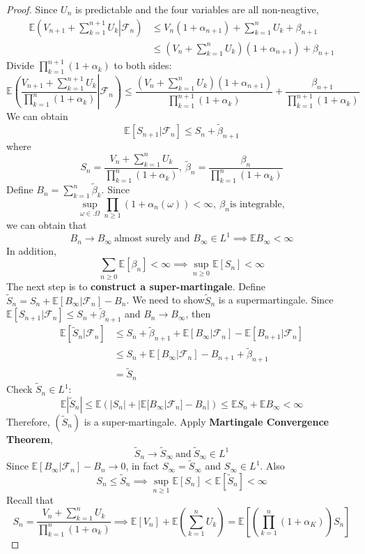 \documentclass[10pt]{article}
\begin{document}
\begin{proof}
Since $U_n$ is predictable and the four variables are all non-neagtive,
\begin{align*}
    \mathbb{E}\left(V_{n+1}+\sum_{k=1}^{n+1}U_k\left.\right|\mathcal{F}_n\right) &\le V_n(1+\alpha_{n+1})+\sum_{k=1}^{n}U_k+\beta_{n+1}\\&\le \left(V_n+\sum_{k=1}^{n}U_k\right)(1+\alpha_{n+1})+\beta_{n+1}
\end{align*}
Divide $\prod_{k=1}^{n+1}(1+\alpha_k)$ to both sides:
$$\mathbb{E}\left(\frac{V_{n+1}+\sum_{k=1}^{n+1}U_k}{\prod_{k=1}^{n}(1+\alpha_k)}\left.\right|\mathcal{F}_n\right) \le \frac{\left(V_n+\sum_{k=1}^{n}U_k\right)(1+\alpha_{n+1})}{\prod_{k=1}^{n+1}(1+\alpha_k)}+\frac{\beta_{n+1}}{\prod_{k=1}^{n+1}(1+\alpha_k)}$$
We can obtain $$\mathbb{E}[S_{n+1}|\mathcal{F}_n]\le S_n +\tilde{\beta}_{n+1}$$ where $$S_n=\frac{V_n+\sum_{k=1}^{n}U_k}{\prod_{k=1}^{n}(1+\alpha_k)}, \ \tilde{\beta}_n=\frac{\beta_n}{\prod_{k=1}^{n}(1+\alpha_k)}$$ Define $B_n=\sum_{k=1}^{n}\tilde{\beta}_k.$ Since $$\sup_{\omega \in. \Omega}\prod_{n \ge 1}(1+\alpha_n(\omega))<\infty, \ \beta_n \text{is integrable},$$ we can obtain that $$B_n \to B_{\infty} \ \text{almost surely and } B_{\infty}\in L^1 \implies \mathbb{E}B_{\infty}<\infty$$ In addition, 
$$\sum_{n \ge 0}\mathbb{E}[\beta_n]<\infty \implies \sup_{n \ge 0}\mathbb{E}[S_n]<\infty$$
The next step is to \textbf{construct a super-martingale}. Define $\tilde{S}_n=S_n+\mathbb{E}[B_{\infty}|\mathcal{F}_n]-B_n$. We need to show$\tilde{S}_n$ is a supermartingale. Since $\mathbb{E}[S_{n+1}|\mathcal{F}_n]\le S_n+\tilde{\beta}_{n+1}$ and $B_n \to B_{\infty}$, then \begin{align*}
   \mathbb{E}[\tilde{S}_{n}|\mathcal{F}_n] &\le  S_n+\tilde{\beta}_{n+1}+\mathbb{E}[B_{\infty}|\mathcal{F}_n]-\mathbb{E}[B_{n+1}|\mathcal{F}_n]\\& \le S_n+\mathbb{E}[B_{\infty}|\mathcal{F}_n]-B_{n+1}+\tilde{\beta}_{n+1}\\&=\tilde{S}_n
\end{align*} 
Check $\tilde{S}_n\in L^1$: $$\mathbb{E}|\tilde{S}_n|\le \mathbb{E}(|S_n|+|\mathbb{E}[B_{\infty}|\mathcal{F}_n]-B_n|)\le \mathbb{E}S_n+\mathbb{E}B_{\infty}<\infty$$
Therefore, $(\tilde{S}_n)$ is a super-martingale. Apply \textbf{Martingale Convergence Theorem}, 
$$\tilde{S}_n \to \tilde{S}_{\infty} \ \text{and} \ \tilde{S}_{\infty}\in L^1$$
Since $\mathbb{E}[B_{\infty}|\mathcal{F}_n]-B_n \to 0$, in fact $S_{\infty}=\tilde{S}_{\infty}$ and $S_{\infty}\in L^1$. Also  $$S_n\le \tilde{S}_n \implies \sup_{n \ge1}\mathbb{E}[S_n]<\mathbb{E}[\tilde{S}_n]<\infty$$ Recall that $$S_n=\frac{V_n+\sum_{k=1}^{n}U_k}{\prod_{k=1}^{n}(1+\alpha_k)} \implies \mathbb{E}[V_n]+\mathbb{E}\left(\sum_{k=1}^{n}U_k\right)=\mathbb{E}[\left(\prod_{k=1}^{n}(1+\alpha_K)\right)S_n]$$

\end{proof}
\end{document}
